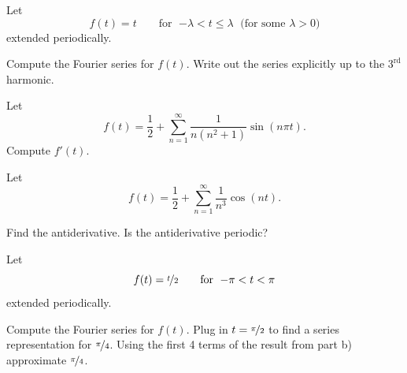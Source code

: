 \begin{exercise}
Let
\begin{equation*}
f(t) = t \qquad \text{for } \; {-\lambda} < t \leq \lambda \; \text{ (for some } \lambda > 0 \text{)}
\end{equation*}
extended periodically.
\begin{tasks}
\task Compute the Fourier series for $f(t)$.
\task Write out the series explicitly up to the $3^{\text{rd}}$ harmonic.
\end{tasks}
\end{exercise}

\begin{exercise}
Let
\begin{equation*}
f(t) = \frac{1}{2} + \sum_{n=1}^\infty
\frac{1}{n(n^2+1)}
\sin(n\pi t) .
\end{equation*}
Compute $f'(t)$.
\end{exercise}

\begin{exercise}
\pagebreak[2]
Let
\begin{equation*}
f(t) = \frac{1}{2} + \sum_{n=1}^\infty
\frac{1}{n^3}
\cos(n t) .
\end{equation*}
\begin{tasks}
\task Find the antiderivative.
\task Is the antiderivative periodic?
\end{tasks}
\end{exercise}

\begin{exercise}
Let
\begin{equation*}
f(t) = \nicefrac{t}{2} \qquad \text{for } \; {-\pi} < t < \pi
\end{equation*}
extended periodically.
\begin{tasks}
\task Compute the Fourier series for $f(t)$.
\task Plug in $t=\nicefrac{\pi}{2}$ to find a series representation
for $\nicefrac{\pi}{4}$.
\task Using the first 4 terms of the result from part b) approximate
$\nicefrac{\pi}{4}$.
\end{tasks}
\end{exercise}

